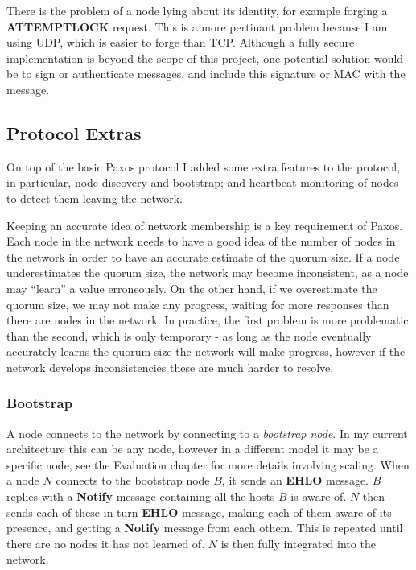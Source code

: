 \documentclass[12pt,twoside,notitlepage]{report}
\newcommand{\msg}[1] {{\bf #1}}         %
\newcommand{\op}[1]  {{\bf #1}}         %
\begin{document}
There is the problem of a node lying about its identity, for example forging a \op{ATTEMPTLOCK}
request. This is a more pertinant problem because I am using UDP, which is easier to forge than
TCP. Although a fully secure implementation is beyond the scope of this project, one potential
solution would be to sign or authenticate messages, and include this signature or MAC with the
message.


\subsection{Protocol Extras}

On top of the basic Paxos protocol I added some extra features to the protocol, in particular,
node discovery and bootstrap; and heartbeat monitoring of nodes to detect them leaving the
network.

Keeping an accurate idea of network membership is a key requirement of Paxos. Each node in the
network needs to have a good idea of the number of nodes in the network in order to have an
accurate estimate of the quorum size. If a node underestimates the quorum size, the network may
become inconsistent, as a node may ``learn'' a value erroneously. On the other hand, if we
overestimate the quorum size, we may not make any progress, waiting for more responses than there
are nodes in the network. In practice, the first problem is more problematic than the second,
which is only temporary - as long as the node eventually accurately learns the quorum size the
network will make progress, however if the network develops inconsistencies these are much harder
to resolve.


\subsubsection{Bootstrap}

A node connects to the network by connecting to a \emph{bootstrap node}. In my current
architecture this can be any node, however in a different model it may be a specific node, see the
Evaluation chapter for more details involving scaling. When a node $N$ connects to the bootstrap
node $B$, it sends an \msg{EHLO} message. $B$ replies with a \msg{Notify} message containing all the
hosts $B$ is aware of. $N$ then sends each of these in turn \msg{EHLO} message, making each of them
aware of its presence, and getting a \msg{Notify} message from each othem. This is repeated until
there are no nodes it has not learned of. $N$ is then fully integrated into the network.
\end{document}
